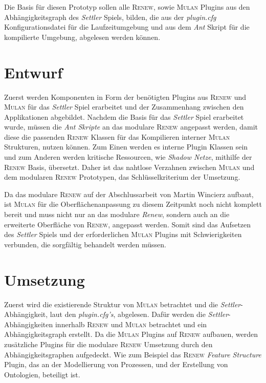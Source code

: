 	Die Basis für diesen Prototyp sollen alle \textsc{Renew}, sowie \textsc{Mulan} Plugins aus den Abhängigkeitsgraph des \textit{Settler} Spiels, bilden, die aus der \textit{plugin.cfg} Konfigurationsdatei für die Laufzeitumgebung und aus dem \textit{Ant} Skript für die kompilierte Umgebung, abgelesen werden können.


\section{Entwurf}
	Zuerst werden Komponenten in Form der benötigten Plugins aus \textsc{Renew} und \textsc{Mulan} für das \textit{Settler} Spiel erarbeitet und der Zusammenhang zwischen den Applikationen abgebildet.\bigbreak
	Nachdem die Basis für das \textit{Settler} Spiel erarbeitet wurde, müssen die \textit{Ant Skripte} an das modulare \textsc{Renew} angepasst werden, damit diese die passenden \textsc{Renew} Klassen für das Kompilieren interner \textsc{Mulan} Strukturen, nutzen können. Zum Einen werden es interne Plugin Klassen sein und zum Anderen werden kritische Ressourcen, wie \textit{Shadow Netze}, mithilfe der \textsc{Renew} Basis, übersetzt. Daher ist das nahtlose Verzahnen zwischen \textsc{Mulan} und dem modularen \textsc{Renew} Prototypen, das Schlüsselkriterium der Umsetzung. \bigbreak
	
	Da das modulare \textsc{Renew} auf der Abschlussarbeit von Martin Wincierz \cite{Wincierz18} aufbaut, ist \textsc{Mulan} für die Oberflächenanpassung zu diesem Zeitpunkt noch nicht komplett bereit und muss nicht nur an das modulare \textit{Renew}, sondern auch an die erweiterte Oberfläche von \textsc{Renew}, angepasst werden.\newline
	Somit sind das Aufsetzen des \textit{Settler} Spiels und der erforderlichen \textsc{Mulan} Plugins mit Schwierigkeiten verbunden, die sorgfältig behandelt werden müssen. 

\section{Umsetzung}
	Zuerst wird die existierende Struktur von \textsc{Mulan} betrachtet und die \textit{Settler}-Abhängigkeit, laut den \textit{plugin.cfg's}, abgelesen. Dafür werden die \textit{Settler}-Abhängigkeiten innerhalb \textsc{Renew} und \textsc{Mulan} betrachtet und ein Abhängigkeitsgraph erstellt. Da die \textsc{Mulan} Plugins auf \textsc{Renew} aufbauen, werden zusätzliche Plugins für die modulare \textsc{Renew} Umsetzung durch den Abhängigkeitsgraphen aufgedeckt. Wie zum Beispiel das \textsc{Renew} \textit{Feature Structure} Plugin, das an der Modellierung von Prozessen, und der Erstellung von Ontologien, beteiligt ist. \bigbreak

